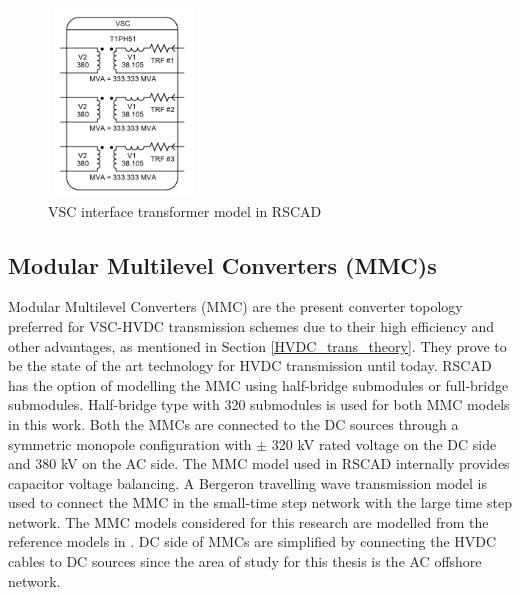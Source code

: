 \begin{figure}[H]
\centering
    \includegraphics[height = 5cm,width = 4cm]{Diagrams/Chapter_4/InterfaceTrafo.PNG}
    \caption{VSC interface transformer model in RSCAD}
    \label{fig:InterfaceTrafo}
\end{figure}

\subsection{Modular Multilevel Converters (MMC)s}
Modular Multilevel Converters (\gls{MMC}) are the present converter topology preferred for \gls{VSC}-\gls{HVDC} transmission schemes due to their high efficiency and other advantages, as mentioned in Section \ref{HVDC_trans_theory}. They prove to be the state of the art technology for \gls{HVDC} transmission until today. RSCAD has the option of modelling the \gls{MMC} using half-bridge submodules or full-bridge submodules. Half-bridge type with 320 submodules is used for both \gls{MMC} models in this work. Both the \gls{MMC}s are connected to the \gls{DC} sources through a symmetric monopole configuration with $\pm$ 320 kV rated voltage on the \gls{DC} side and 380 kV on the \gls{AC} side. 
The \gls{MMC} model used in RSCAD internally provides capacitor voltage balancing. A Bergeron travelling wave transmission model is used to connect the \gls{MMC} in the small-time step network with the large time step network. The \gls{MMC} models considered for this research are modelled from the reference models in \cite{wachal2014guide}. \gls{DC} side of \gls{MMC}s are simplified by connecting the \gls{HVDC} cables to \gls{DC} sources since the area of study for this thesis is the \gls{AC} offshore network. 


